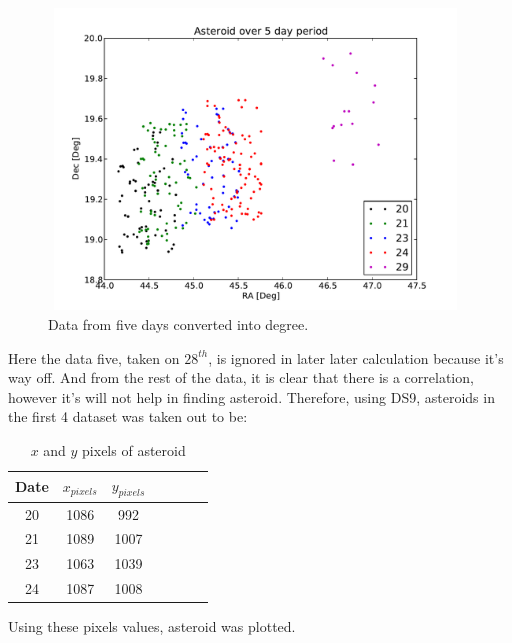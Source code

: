 \documentclass[a4paper,12pt]{article}
\begin{document}
\begin{figure}[H]
	\centering
	\includegraphics[angle=0,height=8cm,width=11cm]{asteroid/Chartfull.pdf}
	\caption{Data from five days converted into degree.}
	\label{fig:chart}
\end{figure}
Here the data five, taken on $28^{th}$, is ignored in later later calculation because it's way off. And from the rest of the data, it is clear that there is a correlation, however it's will not help in finding asteroid. Therefore, using DS9, asteroids in the first 4 dataset was taken out to be:

\begin{table}[H]
\centering %
\caption{$x$ and $y$ pixels of asteroid}
\footnotesize

\begin{tabular}{ccccccc}%
\hline
\hline
Date & $x_{pixels}$ & $y_{pixels}$  \\
\hline
\hline
20   &   1086 & 992\\
21   &    1089& 1007\\
23   &    1063 & 1039\\
24   &  1087&1008\\
\hline
\hline

\end{tabular}
\label{table:pixel} %
\end{table}
Using these pixels values, asteroid was plotted.
\end{document}
